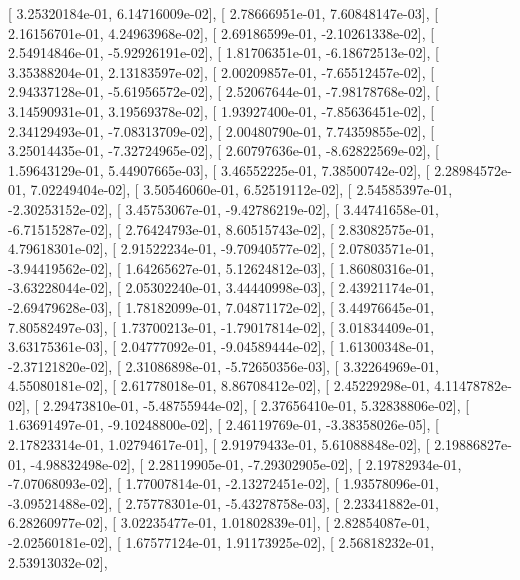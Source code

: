\documentclass{article}
\begin{document}
       [  3.25320184e-01,   6.14716009e-02],
       [  2.78666951e-01,   7.60848147e-03],
       [  2.16156701e-01,   4.24963968e-02],
       [  2.69186599e-01,  -2.10261338e-02],
       [  2.54914846e-01,  -5.92926191e-02],
       [  1.81706351e-01,  -6.18672513e-02],
       [  3.35388204e-01,   2.13183597e-02],
       [  2.00209857e-01,  -7.65512457e-02],
       [  2.94337128e-01,  -5.61956572e-02],
       [  2.52067644e-01,  -7.98178768e-02],
       [  3.14590931e-01,   3.19569378e-02],
       [  1.93927400e-01,  -7.85636451e-02],
       [  2.34129493e-01,  -7.08313709e-02],
       [  2.00480790e-01,   7.74359855e-02],
       [  3.25014435e-01,  -7.32724965e-02],
       [  2.60797636e-01,  -8.62822569e-02],
       [  1.59643129e-01,   5.44907665e-03],
       [  3.46552225e-01,   7.38500742e-02],
       [  2.28984572e-01,   7.02249404e-02],
       [  3.50546060e-01,   6.52519112e-02],
       [  2.54585397e-01,  -2.30253152e-02],
       [  3.45753067e-01,  -9.42786219e-02],
       [  3.44741658e-01,  -6.71515287e-02],
       [  2.76424793e-01,   8.60515743e-02],
       [  2.83082575e-01,   4.79618301e-02],
       [  2.91522234e-01,  -9.70940577e-02],
       [  2.07803571e-01,  -3.94419562e-02],
       [  1.64265627e-01,   5.12624812e-03],
       [  1.86080316e-01,  -3.63228044e-02],
       [  2.05302240e-01,   3.44440998e-03],
       [  2.43921174e-01,  -2.69479628e-03],
       [  1.78182099e-01,   7.04871172e-02],
       [  3.44976645e-01,   7.80582497e-03],
       [  1.73700213e-01,  -1.79017814e-02],
       [  3.01834409e-01,   3.63175361e-03],
       [  2.04777092e-01,  -9.04589444e-02],
       [  1.61300348e-01,  -2.37121820e-02],
       [  2.31086898e-01,  -5.72650356e-03],
       [  3.32264969e-01,   4.55080181e-02],
       [  2.61778018e-01,   8.86708412e-02],
       [  2.45229298e-01,   4.11478782e-02],
       [  2.29473810e-01,  -5.48755944e-02],
       [  2.37656410e-01,   5.32838806e-02],
       [  1.63691497e-01,  -9.10248800e-02],
       [  2.46119769e-01,  -3.38358026e-05],
       [  2.17823314e-01,   1.02794617e-01],
       [  2.91979433e-01,   5.61088848e-02],
       [  2.19886827e-01,  -4.98832498e-02],
       [  2.28119905e-01,  -7.29302905e-02],
       [  2.19782934e-01,  -7.07068093e-02],
       [  1.77007814e-01,  -2.13272451e-02],
       [  1.93578096e-01,  -3.09521488e-02],
       [  2.75778301e-01,  -5.43278758e-03],
       [  2.23341882e-01,   6.28260977e-02],
       [  3.02235477e-01,   1.01802839e-01],
       [  2.82854087e-01,  -2.02560181e-02],
       [  1.67577124e-01,   1.91173925e-02],
       [  2.56818232e-01,   2.53913032e-02],
\end{document}
